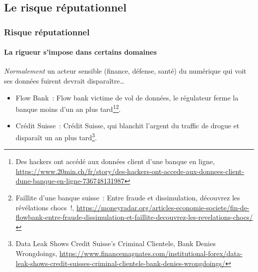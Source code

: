\documentclass{beamer}
\begin{document}
    \subsection{Le risque réputationnel}\label{subsec:risque-reputationnel}
    \begin{frame}
        \frametitle{Risque réputationnel}
        \framesubtitle{La rigueur s'impose dans certains domaines}
        \transdissolve
        \textit{Normalement} un acteur sensible (finance, défense, santé) du numérique qui voit ses données fuirent devrait disparaître\ldots
        \begin{itemize}
            \item Flow Bank~: Flow bank victime de vol de données, le régulateur ferme la banque moins d'un an plus tard\footnote{Des hackers ont accédé aux données client d’une banque en ligne, \url{https://www.20min.ch/fr/story/des-hackers-ont-accede-aux-donnees-client-dune-banque-en-ligne-736748131987}}\footnotestep\footnote{Faillite d’une banque suisse~: Entre fraude et dissimulation, découvrez les révélations chocs~!, \url{https://moneyradar.org/articles-economie-societe/fin-de-flowbank-entre-fraude-dissimulation-et-faillite-decouvrez-les-revelations-chocs/}}.
            \item Crédit Suisse~: Crédit Suisse, qui blanchit l'argent du traffic de drogue et disparaît un an plus tard\footnote{Data Leak Shows Credit Suisse’s Criminal Clientele, Bank Denies Wrongdoings, \url{https://www.financemagnates.com/institutional-forex/data-leak-shows-credit-suisses-criminal-clientele-bank-denies-wrongdoings/}}.
        \end{itemize}
    \end{frame}
\end{document}
